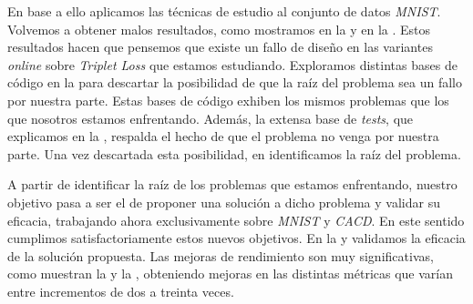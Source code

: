 En base a ello aplicamos las técnicas de estudio al conjunto de datos \textit{MNIST}. Volvemos a obtener malos resultados, como mostramos en la  y en la . Estos resultados hacen que pensemos que existe un fallo de diseño en las variantes \textit{online} sobre \textit{Triplet Loss} que estamos estudiando. Exploramos distintas bases de código en la  para descartar la posibilidad de que la raíz del problema sea un fallo por nuestra parte. Estas bases de código exhiben los mismos problemas que los que nosotros estamos enfrentando. Además, la extensa base de \textit{tests}, que explicamos en la , respalda el hecho de que el problema no venga por nuestra parte. Una vez descartada esta posibilidad, en  identificamos la raíz del problema.

A partir de identificar la raíz de los problemas que estamos enfrentando, nuestro objetivo pasa a ser el de proponer una solución a dicho problema y validar su eficacia, trabajando ahora exclusivamente sobre \textit{MNIST} y \textit{CACD}. En este sentido cumplimos satisfactoriamente estos nuevos objetivos. En la  y  validamos la eficacia de la solución propuesta. Las mejoras de rendimiento son muy significativas, como muestran la  y la , obteniendo mejoras en las distintas métricas que varían entre incrementos de dos a treinta veces.
